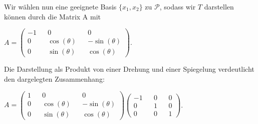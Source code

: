  Wir wählen nun eine geeignete Basis $\{x_1,x_2\}$ zu $\mathcal{P}$, sodass wir $T$ darstellen können durch die Matrix A mit
 \begin{center}
   $A= \begin{pmatrix}
         -1 && 0 && 0 \\
         0 && \cos(\theta) && -\sin(\theta) \\
         0 && \sin(\theta) && \cos(\theta) 
        \end{pmatrix}$.
  \end{center}
 Die Darstellung als Produkt von einer Drehung und einer Spiegelung verdeutlicht den dargelegten Zusammenhang:
 \begin{center}
  $A=\begin{pmatrix}
            1 && 0 && 0 \\
            0 && \cos(\theta) && -\sin(\theta) \\
            0 && \sin(\theta) && \cos(\theta)
           \end{pmatrix} 
           \begin{pmatrix}
            -1 && 0 && 0 \\
            0 && 1 && 0 \\
            0 && 0 && 1
           \end{pmatrix}$.  
 \end{center}
 






